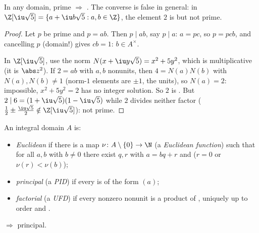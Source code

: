 \begin{proposition}\label{prop:b3:rings:primeirred}
In any domain, prime $\Rightarrow$ . The converse is
false in general: in $\Z[\iu\sqrt 5] = \{a + \iu b\sqrt5 : a, b
\in \Z\}$, the element $2$ is  but not prime.
\end{proposition}

\begin{proof}
Let $p$ be prime and $p = ab$. Then $p \mid ab$, say $p \mid a$:
$a = pc$, so $p = pcb$, and cancelling $p$ (domain!) gives $cb =
1$: $b \in A^\times$.

In $\Z[\iu\sqrt5]$, use the norm $N(x + \iu y\sqrt 5) = x^2 +
5y^2$, which is multiplicative (it is $\abs z^2$). If $2 = ab$
with $a, b$ nonunits, then $4 = N(a)N(b)$ with $N(a), N(b) \neq
1$ (norm-$1$ elements are $\pm1$, the units), so $N(a) = 2$:
impossible, $x^2 + 5y^2 = 2$ has no integer solution. So $2$ is
. But $2 \mid 6 = (1 + \iu\sqrt5)(1 - \iu\sqrt5)$
while $2$ divides neither factor ($\frac12 \pm \frac{\iu\sqrt5}2
\notin \Z[\iu\sqrt5]$): not prime.
\end{proof}

\begin{definition}\label{def:b3:rings:pidufd}
An integral domain $A$ is:
\begin{itemize}
  \item \emph{Euclidean} if there is a map
        $\nu \colon A \setminus \{0\} \to \N$ (a \emph{Euclidean
        function}) such that for all $a, b$ with $b \ne 0$ there
        exist $q, r$ with $a = bq + r$ and ($r = 0$ or $\nu(r) <
        \nu(b)$);
  \item \emph{principal} (a \emph{PID}) if every  is of the form $(a)$;
  \item \emph{factorial} (a \emph{UFD}) if every nonzero nonunit is a product of
        , uniquely up to order and .
\end{itemize}
\end{definition}

\begin{theorem}\label{thm:b3:rings:euclideanpid}
 $\Rightarrow$ principal.
\end{theorem}

